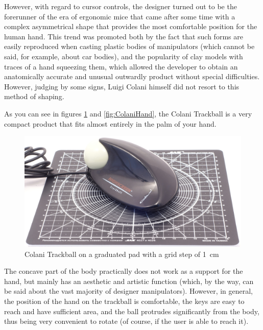 \documentclass[11pt, a4paper]{article}
\begin{document}
However, with regard to cursor controls, the designer turned out to be the forerunner of the era of ergonomic mice that came after some time with a complex asymmetrical shape that provides the most comfortable position for the human hand. This trend was promoted both by the fact that such forms are easily reproduced when casting plastic bodies of manipulators (which cannot be said, for example, about car bodies), and the popularity of clay models with traces of a hand squeezing them, which allowed the developer to obtain an anatomically accurate and unusual outwardly product without special difficulties. However, judging by some signs, Luigi Colani himself did not resort to this method of shaping.

As you can see in figures \ref{fig:ColaniSize} and \ref{fig:ColaniHand}, the Colani Trackball is a very compact product that fits almost entirely in the palm of your hand.

\begin{figure}[h]
    \centering
    \includegraphics[scale=0.5]{1993_colani_trackball/size_30.jpg}
    \caption{Colani Trackball on a graduated pad with a grid step of 1~cm}
    \label{fig:ColaniSize}
\end{figure}

The concave part of the body practically does not work as a support for the hand, but mainly has an aesthetic and artistic function (which, by the way, can be said about the vast majority of designer manipulators). However, in general, the position of the hand on the trackball is comfortable, the keys are easy to reach and have sufficient area, and the ball protrudes significantly from the body, thus being very convenient to rotate (of course, if the user is able to reach it).
\end{document}
